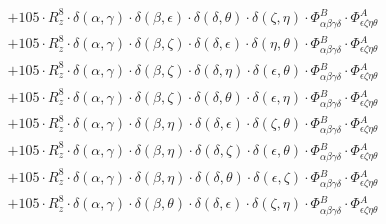 \documentclass{article}
\begin{document}
\begin{equation}
\begin{array}{c}
 \\[0.2em] 		 + 105 \cdot R_{z}^{8} \cdot \delta{}\left(\alpha{}, \gamma{}\right) \cdot \delta{}\left(\beta{}, \epsilon{}\right) \cdot \delta{}\left(\delta{}, \theta{}\right) \cdot \delta{}\left(\zeta{}, \eta{}\right) \cdot \Phi{}^{B}_{\alpha{}\beta{}\gamma{}\delta{}} \cdot \Phi{}^{A}_{\epsilon{}\zeta{}\eta{}\theta{}} 
 \\[0.2em] 		 + 105 \cdot R_{z}^{8} \cdot \delta{}\left(\alpha{}, \gamma{}\right) \cdot \delta{}\left(\beta{}, \zeta{}\right) \cdot \delta{}\left(\delta{}, \epsilon{}\right) \cdot \delta{}\left(\eta{}, \theta{}\right) \cdot \Phi{}^{B}_{\alpha{}\beta{}\gamma{}\delta{}} \cdot \Phi{}^{A}_{\epsilon{}\zeta{}\eta{}\theta{}} 
 \\[0.2em] 		 + 105 \cdot R_{z}^{8} \cdot \delta{}\left(\alpha{}, \gamma{}\right) \cdot \delta{}\left(\beta{}, \zeta{}\right) \cdot \delta{}\left(\delta{}, \eta{}\right) \cdot \delta{}\left(\epsilon{}, \theta{}\right) \cdot \Phi{}^{B}_{\alpha{}\beta{}\gamma{}\delta{}} \cdot \Phi{}^{A}_{\epsilon{}\zeta{}\eta{}\theta{}} 
 \\[0.2em] 		 + 105 \cdot R_{z}^{8} \cdot \delta{}\left(\alpha{}, \gamma{}\right) \cdot \delta{}\left(\beta{}, \zeta{}\right) \cdot \delta{}\left(\delta{}, \theta{}\right) \cdot \delta{}\left(\epsilon{}, \eta{}\right) \cdot \Phi{}^{B}_{\alpha{}\beta{}\gamma{}\delta{}} \cdot \Phi{}^{A}_{\epsilon{}\zeta{}\eta{}\theta{}} 
 \\[0.2em] 		 + 105 \cdot R_{z}^{8} \cdot \delta{}\left(\alpha{}, \gamma{}\right) \cdot \delta{}\left(\beta{}, \eta{}\right) \cdot \delta{}\left(\delta{}, \epsilon{}\right) \cdot \delta{}\left(\zeta{}, \theta{}\right) \cdot \Phi{}^{B}_{\alpha{}\beta{}\gamma{}\delta{}} \cdot \Phi{}^{A}_{\epsilon{}\zeta{}\eta{}\theta{}} 
 \\[0.2em] 		 + 105 \cdot R_{z}^{8} \cdot \delta{}\left(\alpha{}, \gamma{}\right) \cdot \delta{}\left(\beta{}, \eta{}\right) \cdot \delta{}\left(\delta{}, \zeta{}\right) \cdot \delta{}\left(\epsilon{}, \theta{}\right) \cdot \Phi{}^{B}_{\alpha{}\beta{}\gamma{}\delta{}} \cdot \Phi{}^{A}_{\epsilon{}\zeta{}\eta{}\theta{}} 
 \\[0.2em] 		 + 105 \cdot R_{z}^{8} \cdot \delta{}\left(\alpha{}, \gamma{}\right) \cdot \delta{}\left(\beta{}, \eta{}\right) \cdot \delta{}\left(\delta{}, \theta{}\right) \cdot \delta{}\left(\epsilon{}, \zeta{}\right) \cdot \Phi{}^{B}_{\alpha{}\beta{}\gamma{}\delta{}} \cdot \Phi{}^{A}_{\epsilon{}\zeta{}\eta{}\theta{}} 
 \\[0.2em] 		 + 105 \cdot R_{z}^{8} \cdot \delta{}\left(\alpha{}, \gamma{}\right) \cdot \delta{}\left(\beta{}, \theta{}\right) \cdot \delta{}\left(\delta{}, \epsilon{}\right) \cdot \delta{}\left(\zeta{}, \eta{}\right) \cdot \Phi{}^{B}_{\alpha{}\beta{}\gamma{}\delta{}} \cdot \Phi{}^{A}_{\epsilon{}\zeta{}\eta{}\theta{}} 

\end{array}
\end{equation}
\end{document}
